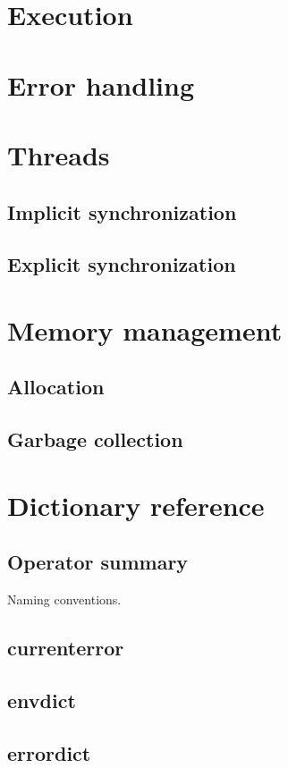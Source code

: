 \section{Execution}

\section{Error handling}

\section{Threads}
\subsection{Implicit synchronization}
\subsection{Explicit synchronization}

\section{Memory management}
\subsection{Allocation}
\subsection{Garbage collection}

\section{Dictionary reference}
\subsection{Operator summary}
Naming conventions.
\subsection{currenterror}
\subsection{envdict}
\subsection{errordict}

